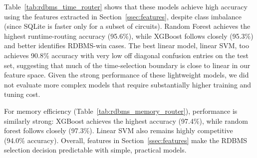 Table~\ref{tab:rdbms_time_router} shows that
these models achieve high accuracy using the features extracted in
Section~\ref{ssec:features}, despite class imbalance (since SQLite is faster only for a
subset of circuits). 
Random Forest achieves the highest runtime-routing accuracy (95.6\%), while XGBoost follows closely (95.3\%) and better identifies RDBMS-win cases.
The best linear model, linear SVM, too achieves 90.8\% accuracy with very low off diagonal confusion entries on the test set, suggesting that much of the
time-selection boundary is close to linear in our feature space. Given the strong performance of these lightweight models, we did not evaluate more
complex models that require substantially higher training and tuning cost.

For memory efficiency
(Table~\ref{tab:rdbms_memory_router}), performance is similarly strong: XGBoost achieves the highest accuracy (97.4\%), while random forest follows closely (97.3\%). Linear SVM also remains  highly competitive (94.0\%
accuracy). Overall, \sys features in Section~\ref{ssec:features} make the RDBMS selection decision
predictable with simple, practical models.

 


 
 

